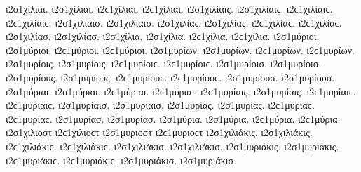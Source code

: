 {ι2σ1χίλιαι. ι2σ1χίλιαι. ι2ϲ1χίλιαι. ι2ϲ1χίλιαι. 
ι2σ1χιλίαις. ι2σ1χιλίαις. ι2ϲ1χιλίαιϲ. ι2ϲ1χιλίαιϲ. 
ι2σ1χιλίαισ. ι2σ1χιλίαισ. 
ι2σ1χιλίας. ι2σ1χιλίας. ι2ϲ1χιλίαϲ. ι2ϲ1χιλίαϲ. 
ι2σ1χιλίασ. ι2σ1χιλίασ. 
ι2σ1χίλια. ι2σ1χίλια. ι2ϲ1χίλια. ι2ϲ1χίλια. 
%
ι2σ1μύριοι. ι2σ1μύριοι. ι2ϲ1μύριοι. ι2ϲ1μύριοι.   %
ι2σ1μυρίων. ι2σ1μυρίων. ι2ϲ1μυρίων. ι2ϲ1μυρίων. 
ι2σ1μυρίοις. ι2σ1μυρίοις. ι2ϲ1μυρίοιϲ. ι2ϲ1μυρίοιϲ. 
ι2σ1μυρίοισ. ι2σ1μυρίοισ. 
ι2σ1μυρίους. ι2σ1μυρίους. ι2ϲ1μυρίουϲ. ι2ϲ1μυρίουϲ. 
ι2σ1μυρίουσ. ι2σ1μυρίουσ. 
ι2σ1μύριαι. ι2σ1μύριαι. ι2ϲ1μύριαι. ι2ϲ1μύριαι. 
ι2σ1μυρίαις. ι2σ1μυρίαις. ι2ϲ1μυρίαιϲ. ι2ϲ1μυρίαιϲ. 
ι2σ1μυρίαισ. ι2σ1μυρίαισ. 
ι2σ1μυρίας. ι2σ1μυρίας. ι2ϲ1μυρίαϲ. ι2ϲ1μυρίαϲ. 
ι2σ1μυρίασ. ι2σ1μυρίασ. 
ι2σ1μύρια. ι2σ1μύρια. ι2ϲ1μύρια. ι2ϲ1μύρια. 
%
ι2σ1χιλιοστ ι2ϲ1χιλιοϲτ   %
%
ι2σ1μυριοστ ι2ϲ1μυριοϲτ   %
%
ι2σ1χιλιάκις. ι2σ1χιλιάκις. ι2ϲ1χιλιάκιϲ. ι2ϲ1χιλιάκιϲ.   %
ι2σ1χιλιάκισ. ι2σ1χιλιάκισ. 
%
ι2σ1μυριάκις. ι2σ1μυριάκις. ι2ϲ1μυριάκιϲ. ι2ϲ1μυριάκιϲ.   %
ι2σ1μυριάκισ. ι2σ1μυριάκισ. 
}
